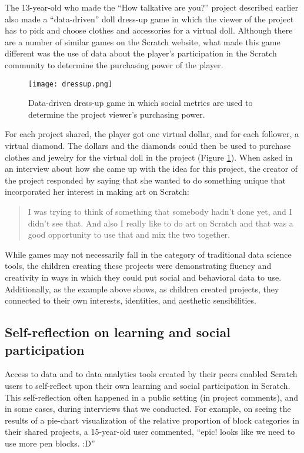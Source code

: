 \documentclass{sigchi}
\begin{document}
The 13-year-old who made the ``How talkative are you?'' project described earlier also made a ``data-driven'' doll dress-up game in which the viewer of the project has to pick and choose clothes and accessories for a virtual doll. Although there are a number of similar games on the Scratch website, what made this game different was the use of data about the player's participation in the Scratch community to determine the purchasing power of the player.

\begin{figure}[h!]
\texttt{[image: dressup.png]}
\centering
\caption{Data-driven dress-up game in which social metrics are used to determine the project viewer's purchasing power.}
\label{fig:example-dressup}
\end{figure}

For each project shared, the player got one virtual dollar, and for each follower, a virtual diamond. The dollars and the diamonds could then be used to purchase clothes and jewelry for the virtual doll in the project (Figure \ref{fig:example-dressup}). When asked in an interview about how she came up with the idea for this project, the creator of the project responded by saying that she wanted to do something unique that incorporated her interest in making art on Scratch:

\begin{quote}
I was trying to think of something that somebody hadn’t done yet, and I didn’t see that. And also I really like to do art on Scratch and that was a good opportunity to use that and mix the two together.
\end{quote}

While games may not necessarily fall in the category of traditional data science tools, the children creating these projects were demonstrating fluency and creativity in ways in which they could put social and behavioral data to use. Additionally, as the example above shows, as children created projects, they connected to their own interests, identities, and aesthetic sensibilities.

\subsection{Self-reflection on learning and social participation}

Access to data and to data analytics tools created by their peers enabled Scratch users to self-reflect upon their own learning and social participation in Scratch. This self-reflection often happened in a public setting (in project comments), and in some cases, during interviews that we conducted. For example, on seeing the results of a pie-chart visualization of the relative proportion of block categories in their shared projects, a 15-year-old user commented, ``epic! looks like we need to use more pen blocks. :D''
\end{document}
